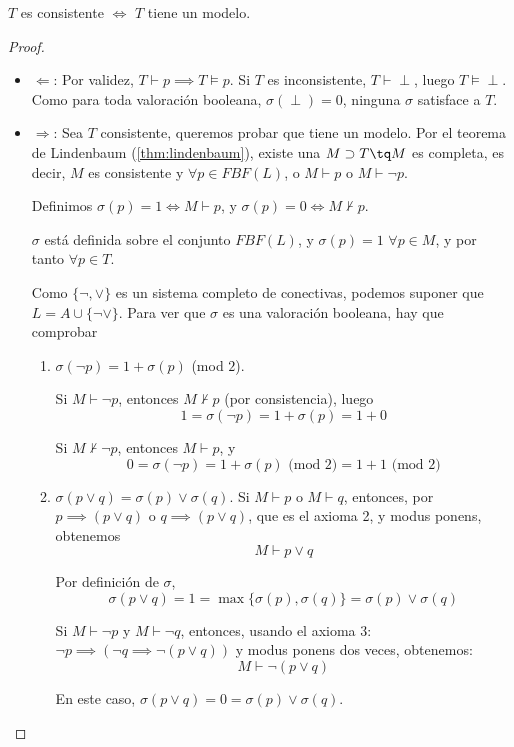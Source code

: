\begin{theorem}
	$T$ es consistente $\iff$ $T$ tiene un modelo.
	\label{thm:comp2}
\end{theorem}
\begin{proof}
	\begin{itemize}
		\item $\Longleftarrow$: Por validez, $T\vdash p \implies T\vDash p$. Si $T$ es inconsistente, $T\vdash \perp$, luego $T\vDash\perp$. Como para toda valoración booleana, $\sigma(\perp) = 0$, ninguna $\sigma$ satisface a $T$.
		\item $\Longrightarrow$: Sea $T$ consistente, queremos probar que tiene un modelo. Por el teorema de Lindenbaum (\ref{thm:lindenbaum}), existe una $M\supset T \tq M$ es completa, es decir, $M$ es consistente y $\forall p \in FBF(L)$, o $M\vdash p$ o $M\vdash \neg p$.

		Definimos $\sigma(p) = 1 \iff M\vdash p$, y $\sigma(p) = 0 \iff M\nvdash p$.

		$\sigma$ está definida sobre el conjunto $FBF(L)$, y $\sigma(p) = 1$ $\forall p \in M$, y por tanto $\forall p\in T$.

		Como $\{\neg, \vee\}$ es un sistema completo de conectivas, podemos suponer que $L=A\cup\{\neg\vee\}$. Para ver que $\sigma$ es una valoración booleana, hay que comprobar
		\begin{enumerate}
			\item $\sigma(\neg p) = 1+\sigma(p)$ (mod $2$).

			Si $M \vdash \neg p$, entonces $M\nvdash p$ (por consistencia), luego
			$$1 = \sigma(\neg p) = 1+\sigma(p) = 1 + 0$$

			Si $M \nvdash \neg p$, entonces $M\vdash p$, y
			$$0=\sigma(\neg p) = 1+\sigma(p) \text{ (mod 2)} = 1+1 \text{ (mod 2)}$$

			\item $\sigma(p\vee q) = \sigma(p)\vee\sigma(q)$.
			Si $M\vdash p$ o $M\vdash q$, entonces, por $p\implies (p\vee q)$ o $q\implies (p\vee q)$, que es el axioma 2, y modus ponens, obtenemos
			$$M\vdash p \vee q$$

			Por definición de $\sigma$,
			$$\sigma(p\vee q) = 1 = \max\{\sigma(p), \sigma(q)\} = \sigma(p)\vee\sigma(q)$$

			Si $M\vdash \neg p$ y $M\vdash \neg q$, entonces, usando el axioma 3: $\neg p \implies (\neg q \implies \neg(p\vee q))$ y modus ponens dos veces, obtenemos:
			$$M\vdash \neg(p\vee q)$$

			En este caso, $\sigma(p\vee q) = 0 = \sigma(p) \vee \sigma(q)$.
		\end{enumerate}
	\end{itemize}
\end{proof}

